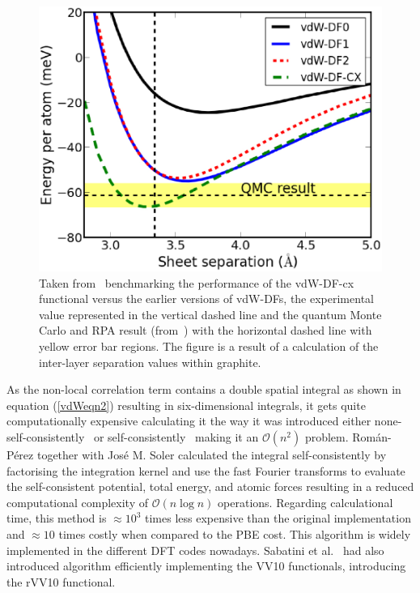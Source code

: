 \begin{figure}
    \centering
    \includegraphics[scale=1.0,keepaspectratio]{Figs/svdWGraphite.jpg}
    \caption{Taken from~\cite{vdWreview} benchmarking the performance of the vdW-DF-cx functional versus the earlier versions of vdW-DFs, the experimental value represented in the vertical dashed line and the quantum Monte Carlo and RPA result (from~\cite{Lebegue2010PRL, Spanu2009PRL}) with the horizontal dashed line with yellow error bar regions. The figure is a result of a calculation of the inter-layer separation values within graphite.}
    \label{fig:svdWGraphite}
\end{figure}

As the non-local correlation term contains a double spatial integral as shown in equation (\ref{vdWeqn2}) resulting in six-dimensional integrals, it gets quite computationally expensive calculating it the way it was introduced either none-self-consistently~\cite{Dion2004} or self-consistently~\cite{thonhauser2007van} making it an $\mathcal{O}(n^2)$ problem. Román-Pérez together with José M. Soler\cite{NlogNalgorithm} calculated the integral self-consistently by factorising the integration kernel and use the fast Fourier transforms to evaluate the self-consistent potential, total energy, and atomic forces resulting in a reduced computational complexity of $\mathcal{O}(n\log{}n)$ operations. Regarding calculational time, this method is $\approx 10^3$ times less expensive than the original implementation and $\approx 10$ times costly when compared to the PBE cost. This algorithm is widely implemented in the different DFT codes nowadays. Sabatini et al.~\cite{Sabatini2013} had also introduced algorithm efficiently implementing the VV10 functionals, introducing the rVV10 functional.

